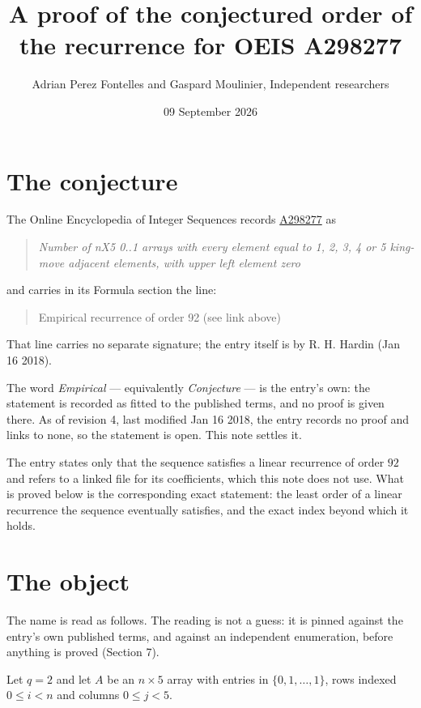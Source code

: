 \documentclass[11pt]{article}
\title{A proof of the conjectured order of the recurrence for OEIS A298277}
\author{Adrian Perez Fontelles and Gaspard Moulinier, Independent researchers}
\date{09 September 2026}
\theoremstyle{definition}
\begin{document}
\maketitle
\section{The conjecture}

The Online Encyclopedia of Integer Sequences records \href{https://oeis.org/A298277}{A298277} as

\begin{quote}\itshape Number of nX5 0..1 arrays with every element equal to 1, 2, 3, 4 or 5 king-move adjacent elements, with upper left element zero\end{quote}

and carries in its Formula section the line:

\begin{quote}\ttfamily Empirical recurrence of order 92 (see link above)\end{quote}

That line carries no separate signature; the entry itself is by R. H. Hardin (Jan 16 2018).

The word {\itshape Empirical} --- equivalently {\itshape Conjecture} --- is the entry's own: the statement is recorded as fitted to the published terms, and no proof is given there. As of revision 4, last modified Jan 16 2018, the entry records no proof and links to none, so the statement is open. This note settles it.

The entry states only that the sequence satisfies a linear recurrence of order $92$ and refers to a linked file for its coefficients, which this note does not use. What is proved below is the corresponding exact statement: the least order of a linear recurrence the sequence eventually satisfies, and the exact index beyond which it holds.

\section{The object}

The name is read as follows. The reading is not a guess: it is pinned against the entry's own published terms, and against an independent enumeration, before anything is proved (Section 7).

Let $q = 2$ and let $A$ be an $n \times 5$ array with entries in $\{0,1,\dots,1\}$, rows indexed $0 \le i < n$ and columns $0 \le j < 5$.
\end{document}
